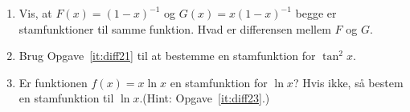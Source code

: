 \begin{enumerate}
	\item Vis, at $F(x)=(1-x)^{-1}$ og $G(x)=x(1-x)^{-1}$ begge er stamfunktioner til samme funktion. Hvad er differensen mellem $F$ og $G$.

	\item Brug Opgave~\ref{it:diff21} til at bestemme en stamfunktion for $\tan^2 x$.
	
	\item Er funktionen $f(x)=x\ln x$ en stamfunktion for $\ln x$? Hvis ikke, så bestem en stamfunktion til $\ln x$.(Hint: Opgave~\ref{it:diff23}.)
	
	
	
\end{enumerate}